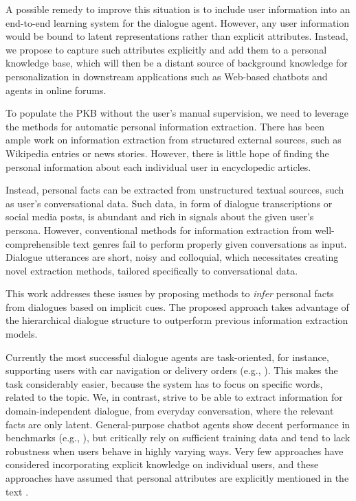 \noindent A possible remedy to improve this situation is to include user information
into an end-to-end learning system for the dialogue agent. 
However, any user information would be bound to latent representations rather than explicit attributes.
Instead, we propose to capture such attributes explicitly and add them to a personal knowledge base, which will then be a distant source of background knowledge
for personalization in downstream applications such as
Web-based chatbots and agents in online forums.

To populate the PKB without the user's manual supervision, we need to leverage the methods for automatic personal information extraction. There has been ample work on information extraction from structured external sources, such as Wikipedia entries or news stories. However, there is little hope of finding the personal information about each individual user in encyclopedic articles. 

Instead, personal facts can be extracted from unstructured textual sources, such as user's conversational data. Such data, in form of dialogue transcriptions or social media posts, is abundant and rich in signals about the given user's persona. However, conventional methods for information extraction from well-comprehensible text genres fail to perform properly given conversations as input. Dialogue utterances are short, noisy and colloquial, which necessitates creating novel extraction methods, tailored specifically to conversational data.

This work addresses these issues by proposing methods to \textit{infer} personal facts from dialogues based on implicit cues. The proposed approach takes advantage of the hierarchical dialogue structure to outperform previous information extraction models.

Currently the most successful dialogue agents are task-oriented, 
for instance, supporting users with car navigation or delivery orders
(e.g., \cite{dial6,AAAI1816104}).
This makes the task considerably easier, because the system has to focus on specific words, related to the topic. We, in contrast, strive to be able to extract information for domain-independent dialogue, from everyday conversation, where the relevant facts are only latent.
General-purpose chatbot agents show decent performance in
benchmarks (e.g., \cite{bot1,pers1,dial8}), 
but critically rely on sufficient training data and
tend to lack robustness when users behave in highly varying ways.
Very few approaches have considered incorporating explicit knowledge
on individual users, and these approaches have assumed that personal attributes
are explicitly mentioned in the text \cite{dial7,zhang2018personalizing,jing-kambhatla-roukos:2007:ACLMain}.

